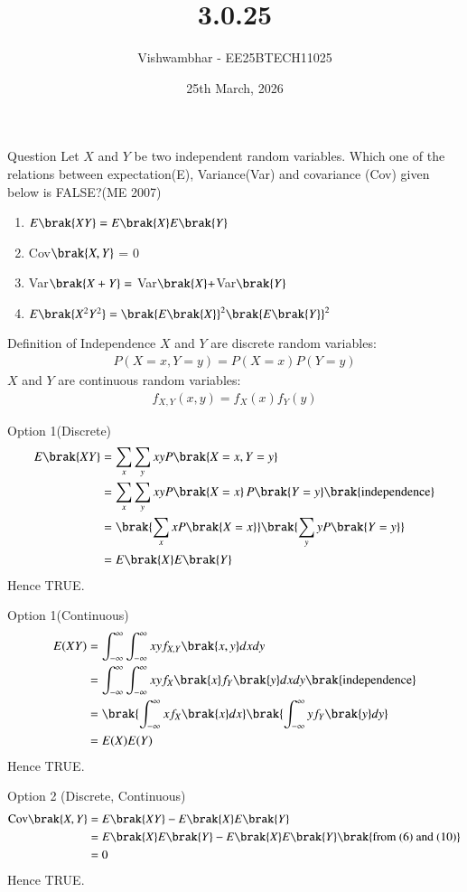 \documentclass{beamer}
\title{3.0.25}
\date{25th March, 2026}
\author{Vishwambhar - EE25BTECH11025}
\begin{document}
\frame{\titlepage}
\begin{frame}{Question}
Let $X$ and $Y$ be two independent random variables. Which one of the relations between expectation(E), Variance(Var) and covariance (Cov) given below is FALSE?(ME 2007)\\
\begin{enumerate}
    \item $E\brak{XY}=E\brak{X}E\brak{Y}$
    \item Cov$\brak{X,Y}$ = 0
    \item Var$\brak{X+Y}=$ Var$\brak{X}+$Var$\brak{Y}$
    \item $E\brak{X^2Y^2}=\brak{E\brak{X}}^2\brak{E\brak{Y}}^2$
\end{enumerate}
\end{frame}

\begin{frame}{Definition of Independence}
$X$ and $Y$ are discrete random variables:
\begin{align}
    P(X=x,Y=y)=P(X=x)P(Y=y)
\end{align}
$X$ and $Y$ are continuous random variables:
\begin{align}
    f_{X,Y}(x,y)=f_X(x)f_Y(y)
\end{align}
\end{frame}

\begin{frame}{Option 1(Discrete)}
\begin{align}
E\brak{XY} 
&= \sum_x \sum_y xyP\brak{X=x, Y=y} \\
&= \sum_x \sum_y xyP\brak{X=x}\,P\brak{Y=y}\brak{\text{independence}} \\
&= \brak{\sum_x xP\brak{X=x}}\brak{\sum_y yP\brak{Y=y}}\\
&= E\brak{X}E\brak{Y}
\end{align}
Hence TRUE.
\end{frame}

\begin{frame}{Option 1(Continuous)}
\begin{align}
E(XY) 
&= \int_{-\infty}^{\infty} \int_{-\infty}^{\infty} xyf_{X,Y}\brak{x,y}dxdy \\
&= \int_{-\infty}^{\infty} \int_{-\infty}^{\infty} xyf_X\brak{x} f_Y\brak{y} dxdy\brak{\text{independence}} \\
&= \brak{\int_{-\infty}^{\infty} x f_X\brak{x} dx }
   \brak{\int_{-\infty}^{\infty} y f_Y\brak{y}dy}\\
&= E(X)E(Y)
\end{align}
Hence TRUE.


\end{frame}
\begin{frame}{Option 2 (Discrete, Continuous)}
\begin{align}
\text{Cov}\brak{X,Y}
&= E\brak{XY} - E\brak{X}E\brak{Y} \\
&= E\brak{X}E\brak{Y} - E\brak{X}E\brak{Y} \brak{\text{from (6) and (10)}} \\
&= 0
\end{align}
Hence TRUE.
\end{frame}
\end{document}
